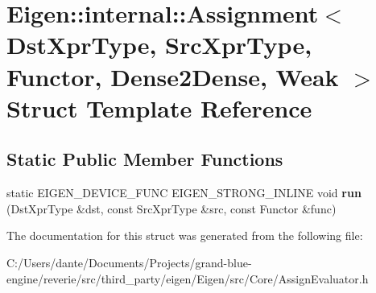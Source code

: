 \hypertarget{struct_eigen_1_1internal_1_1_assignment_3_01_dst_xpr_type_00_01_src_xpr_type_00_01_functor_00_01_dense2_dense_00_01_weak_01_4}{}\section{Eigen\+::internal\+::Assignment$<$ Dst\+Xpr\+Type, Src\+Xpr\+Type, Functor, Dense2\+Dense, Weak $>$ Struct Template Reference}
\label{struct_eigen_1_1internal_1_1_assignment_3_01_dst_xpr_type_00_01_src_xpr_type_00_01_functor_00_01_dense2_dense_00_01_weak_01_4}
\subsection*{Static Public Member Functions}
\begin{DoxyCompactItemize}
\item 
\mbox{\label{struct_eigen_1_1internal_1_1_assignment_3_01_dst_xpr_type_00_01_src_xpr_type_00_01_functor_00_01_dense2_dense_00_01_weak_01_4_a23b7a4281a249055ccd7f123144a3a84}} 
static E\+I\+G\+E\+N\+\_\+\+D\+E\+V\+I\+C\+E\+\_\+\+F\+U\+NC E\+I\+G\+E\+N\+\_\+\+S\+T\+R\+O\+N\+G\+\_\+\+I\+N\+L\+I\+NE void {\bfseries run} (Dst\+Xpr\+Type \&dst, const Src\+Xpr\+Type \&src, const Functor \&func)
\end{DoxyCompactItemize}


The documentation for this struct was generated from the following file\+:\begin{DoxyCompactItemize}
\item 
C\+:/\+Users/dante/\+Documents/\+Projects/grand-\/blue-\/engine/reverie/src/third\+\_\+party/eigen/\+Eigen/src/\+Core/Assign\+Evaluator.\+h\end{DoxyCompactItemize}
